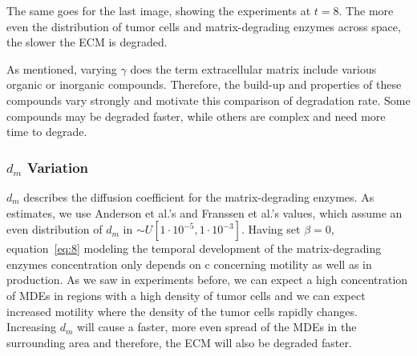 The same goes for the last image, showing the experiments at $t=8$. The more even the distribution of tumor cells and matrix-degrading enzymes across space, the slower the ECM is degraded.

As mentioned, varying $\gamma$ does the term extracellular matrix include various organic or inorganic compounds. Therefore, the build-up and properties of these compounds vary strongly and motivate this comparison of degradation rate. Some compounds may be degraded faster, while others are complex and need more time to degrade. 

\subsubsection*{$d_m$ Variation}
$d_m$ describes the diffusion coefficient for the matrix-degrading enzymes. As estimates, we use Anderson et al.'s and Franssen et al.'s values, which assume an even distribution of $d_m$ in $\sim U[1\cdot 10^{-5},1\cdot 10^{-3}]$. Having set $\beta=0$, equation~\ref{eq:8} modeling the temporal development of the matrix-degrading enzymes concentration only depends on c concerning motility as well as in production. As we saw in experiments before, we can expect a high concentration of MDEs in regions with a high density of tumor cells and we can expect increased motility where the density of the tumor cells rapidly changes. Increasing $d_m$ will cause a faster, more even spread of the MDEs in the surrounding area and therefore, the ECM will also be degraded faster.

